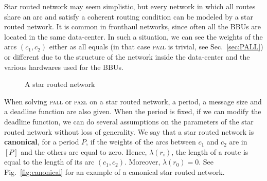 \documentclass[a4paper,10pt]{article}
\newcommand\pazl{\textsc{pazl}\xspace}
\newcommand\pall{\textsc{pall}\xspace}
\begin{document}
		Star routed network may seem simplistic, but every network in which all routes share an arc and satisfy a coherent routing condition can be modeled by a star routed network.
		It is common in fronthaul networks, since often all the BBUs are located in the same data-center. In such a situation, we can see the weights of the arcs $(c_1,c_2)$ either as all equals (in that case \pazl is trivial, see Sec.~\ref{sec:PALL}) or different due to the structure of the network inside the data-center and the various hardwares used for the BBUs. 

      \begin{figure}
       \begin{center}

  \end{center}
  \caption{A star routed network}
  \end{figure}
	
	
  When solving \pall or \pazl on a star routed network, a period, a message size and a deadline function are also given. When the period is fixed, if we can modify the deadline function, we can do several assumptions on the parameters of the star routed network without loss of generality. We say that a star routed network is \textbf{canonical}, for a period $P$, if the weights of the arcs between $c_1$ and $c_2$ are in $[P]$ and the others are equal to zero. Hence, $\lambda(r_i)$, the length of a route is equal to the length of its arc $(c_1,c_2)$. Moreover, $\lambda(r_0) = 0$. See Fig.~\ref{fig:canonical} for an example of a canonical star routed network.  
  
\end{document}
